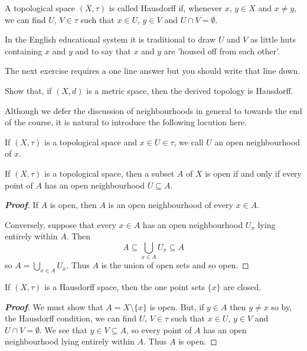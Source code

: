 \begin{definition} A topological space $(X,\tau)$ is called
Hausdorff if, whenever $x,\,y\in X$ and $x\neq y$, we can
find $U,\,V\in\tau$ such that $x\in U$, $y\in V$ and
$U\cap V=\emptyset$.
\end{definition}
In the English educational system it is traditional
to draw $U$ and $V$ as little huts containing $x$ and $y$
and to say that $x$ and $y$ are 'housed off from each other'.

The next exercise requires a one line answer but you should
write that line down.
\begin{problem} Show that,
if $(X,d)$ is a metric space, then the
derived topology is Hausdorff.
\end{problem}

Although we defer the discussion of neighbourhoods
in general to towards the end of the course, it is natural
to introduce the following locution here.
\begin{definition}\label{D;open neighbourhood}
If $(X,\tau)$ is a topological space and $x\in U\in\tau$,
we call $U$ an open neighbourhood of $x$.
\end{definition}



\begin{theorem}\label{T;open via neighbourhood}
If $(X,\tau)$ is a topological space, then
a subset $A$ of $X$ is open if and only if every
point of $A$ has an open neighbourhood $U\subseteq A$.
\end{theorem}
\begin{proof}[\bf Proof]
If $A$ is open, then $A$ is an open neighbourhood of every $x\in A$.

Conversely, suppose that every $x\in A$ has an open neighbourhood
$U_{x}$ lying entirely within $A$. Then
\[A\subseteq \bigcup_{x\in A} U_{x}\subseteq A\]
so $A= \bigcup_{x\in A} U_{x}$. Thus $A$ is the union of open sets
and so open.
\end{proof}


\begin{theorem}\label{L;Hausdorff point}
If $(X,\tau)$ is a Hausdorff space, then the one
point sets $\{x\}$ are closed.
\end{theorem}
\begin{proof}[\bf Proof] We must show that $A=X\setminus\{x\}$ is open.
But, if $y\in A$ then $y\neq x$ so by, the Hausdorff condition,
we can find $U,\,V\in\tau$ such that $x\in U$, $y\in V$
and $U\cap V=\emptyset$. We see that $y\in V\subseteq A$,
so every point of $A$ has an open neighbourhood
lying entirely within $A$. Thus $A$ is open.
\end{proof}


